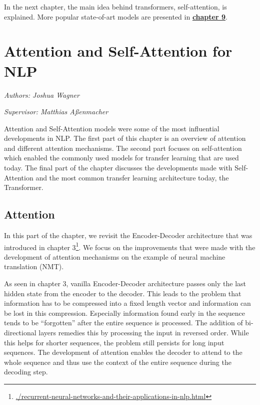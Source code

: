 \documentclass[]{krantz}
\renewcommand{\href}[2]{#2\footnote{\url{#1}}}
\begin{document}
In the next chapter, the main idea behind transformers, self-attention, is explained. More popular state-of-art models are presented in \protect\hyperlink{transfer-learning-for-nlp-ii}{\textbf{chapter 9}}.

\hypertarget{attention-and-self-attention-for-nlp}{%
\chapter{Attention and Self-Attention for NLP}\label{attention-and-self-attention-for-nlp}}

\emph{Authors: Joshua Wagner}

\emph{Supervisor: Matthias Aßenmacher}

Attention and Self-Attention models were some of the most influential developments in NLP.
The first part of this chapter is an overview of attention and different attention mechanisms.
The second part focuses on self-attention which enabled the commonly used models
for transfer learning that are used today. The final part of the chapter discusses the
developments made with Self-Attention and the most common transfer learning architecture today, the Transformer.

















\hypertarget{attention}{%
\section{Attention}\label{attention}}

In this part of the chapter, we revisit the Encoder-Decoder architecture that was introduced
in \href{./recurrent-neural-networks-and-their-applications-in-nlp.html}{chapter 3}. We focus on the improvements
that were made with the development of attention mechanisms on the example of neural machine translation (NMT).

As seen in chapter 3, vanilla
Encoder-Decoder architecture passes only the last hidden state from the encoder to the decoder.
This leads to the problem that information has to be compressed into a fixed length
vector and information can be lost in this compression.
Especially information found early in the sequence tends to be ``forgotten'' after
the entire sequence is processed. The addition of bi-directional layers remedies
this by processing the input in reversed order. While this helps for shorter sequences,
the problem still persists for long input sequences.
The development of attention enables the decoder to attend to the whole sequence and
thus use the context of the entire sequence during the decoding step.
\end{document}
